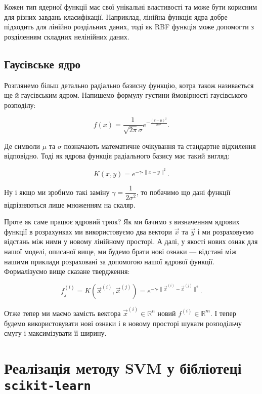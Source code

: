 \documentclass[]{article}
\begin{document}
Кожен тип ядерної функції має свої унікальні властивості та може бути корисним для різних завдань класифікації. Наприклад, лінійна функція ядра добре підходить для лінійно роздільних даних, тоді як RBF функція може допомогти з розділенням складних нелінійних даних.

\subsection{Гаусівське ядро}

Розглянемо більш детально радіально базисну функцію, котра також називається ще й гаусівським ядром. Напишемо формулу густини ймовірності гаусівського розподілу:

\begin{equation*}
	f(x) = \frac1{\sqrt{2\pi}\sigma}e^{-\frac{(x - \mu)^2}{2\sigma^2}}.
\end{equation*}

Де символи $\mu$ та $\sigma$ позначають математичне очікування та стандартне відхилення відповідно. Тоді як ядрова функція радіального базису має такий вигляд:

\begin{equation*}
	K(x, y) = e^{-\gamma \cdot \|x - y\|^2}.
\end{equation*}

Ну і якщо ми зробимо такі заміну $\gamma = \dfrac1{2\sigma^2}$, то побачимо що дані функції відрізняються лише множенням на скаляр.

Проте як саме працює ядровий трюк? Як ми бачимо з визначенням ядрових функції в розрахунках ми використовуємо два вектори $\vec{x}$ та $\vec{y}$ і ми розраховуємо відстань між ними у новому лінійному просторі. А далі, у якості нових ознак для нашої моделі, описаної вище, ми будемо брати нові ознаки --- відстані між нашими приклади розраховані за допомогою нашої ядрової функції. Формалізуємо вище сказане твердження:

\begin{equation*}
	f_j^{(i)} = K(\vec{x}^{(i)}, \vec{x}^{(j)}) = e^{-\gamma \cdot \|\vec{x}^{(i)} - \vec{x}^{(j)}\|^2}.
\end{equation*}

Отже тепер ми маємо замість вектора $\vec{x}^{(i)} \in \mathbb{R}^n$ новий $f^{(i)} \in \mathbb{R}^m$. І тепер будемо використовувати нові ознаки і в новому просторі шукати розподільчу смугу і максимізувати її ширину.

\section{Реалізація методу SVM у бібліотеці \texttt{scikit-learn}}
\end{document}
